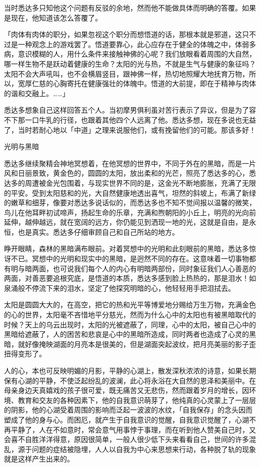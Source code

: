 \documentclass[12pt,twoside,openany]{book}
\begin{document}
当时悉达多只知他这个问题有反驳的余地，然而他不能做具体而明确的答覆。如果是现在，他知道该怎么答覆了。

「肉体有肉体的职分，如果忽视这个职分而想悟道的话，那根本就是邪道，这只不过是一种观念上的游戏罢了。悟道要靠心，此心应存在于健全的体魄之中，体弱多病，意识模糊的人，用什么条件来接触神佛的心呢？我们放眼看着周围的大自然，哪一样生物不是跃动着健康的生命？太阳的光与热，不就是生气与健康的象征吗？太阳不会大声吼叫，也不会横眉竖目，跟神佛一样，热切地照耀大地抚育万物，所以，宽厚仁慈的心胸寄托在健康强壮的体魄中。悟道的大前提，即在于精神与肉体的谐和交融上。……」

悉达多想象自己这样回答五个人。当初摩男俱利虽对苦行表示了异议，但是为了容不下那一口牛乳的行径，也跟着其他四个人远离了他。悉达多想，现在多说也无益了，当时若耐心地以「中道」之理来说服他们，或有挽留他们的可能。那该多好！

光明与黑暗

悉达多继续聚精会神地冥想着，在他冥想的世界中，不同于外在的黑暗，而是一片风和日丽景致，黄金色的，圆圆的太阳，放出柔和的光芒，照亮了悉达多的心，悉达多的周遭被金光包围着，与现实世界不同的是，这金光不断地膨胀，充满了无限的平安。受到太阳慈和的光，大自然健康地透出喜气，坦然的斜坡上，布满了新绿的嫩草和细芽，像要对悉达多说话似的，而悉达多也不知不觉间报以温馨的微笑，鸟儿在他耳畔初试啼声，扬起生命的乐章，充满和煦朝阳的小丘上，明亮的光向前延伸，越伸越远，就在宽阔的远方，你仍能见到洒现一地的光，这就是自由，是永恒，也是真实。悉达多仔细审顾自己和自己所站的地方。

睁开眼睛，森林的黑暗满布眼前。对着冥想中的光明和此刻眼前的黑暗，悉达多惊讶不已。冥想中的光明和现实中的黑暗，是迥然不同的存在。这意味着一切事物都有明与暗两面，也可说我们每个人的内心有明暗两部份，同时象征我们人心善恶的两面，对善恶要追根究底，是悟道的本质，悉达多感到脸上热热的，那是泪水！如泉涌般不停流下来的泪水，坚定了他探究明暗的心，他轻轻用手把泪拭去。

太阳是圆圆大大的，在高空，把它的热和光平等博爱地分赐给万生万物，充满金色的心的世界，太阳毫不吝惜地平分慈光，然而为什么心中的太阳也有被黑暗取代的时候？天上的乌云出现时，太阳的光被遮蔽了，同理，心中的太阳，被自己心中的黑暗给遮蔽了，人的困苦和悲哀是心中的黑暗所造成，同时两者也造成了心灵的黑暗，就好像掩映湖面的月亮本是很美的，但是湖面突起波纹，把月亮美丽的影子歪扭得变形了。

人的心，本也可反映明媚的月影，平静的心湖上，散发深秋浓浓的诗意，如果长期保有心湖的平静，不使泛起纷乱的波澜，此心将永浴在大自然的恩泽和美丽中。在母亲身边天真嬉戏的孩子很可爱，既无痛苦又无悲伤，然而跟着岁月的增长，因环境、教育和交友的各种因素下，他的自我意识萌芽了，他纯真的心灵蒙上了一层层的阴影，他的心湖受着周围的影响而泛起一波波的水纹，「自我保存」的念头因而塑成了他的身与心。而困厄，就产生于自我意识的觉醒，自我意识觉醒了，心湖不再平静了，人在不如意时，常会意气用事悖于事理，而在听到他人赞美自己时，又会喜不自胜洋洋得意，原因很简单，一般人很少低下头来看看自己，世间的许多混乱，源于问题的症结被隐埋，人人以自我为中心来思想来行动，各种脱了轨的现象就是这样产生出来的。
\end{document}

